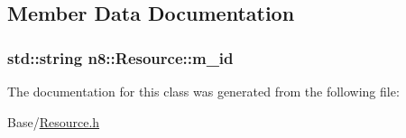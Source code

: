 \subsection{Member Data Documentation}
\hypertarget{classn8_1_1_resource_a7a80eb975bb76b4e8c5b3b60de210f23}{
\subsubsection[{m\-\_\-id}]{\setlength{\rightskip}{0pt plus 5cm}std\-::string n8\-::\-Resource\-::m\-\_\-id\hspace{0.3cm}{\ttfamily [private]}}}\label{classn8_1_1_resource_a7a80eb975bb76b4e8c5b3b60de210f23}


The documentation for this class was generated from the following file\-:\begin{DoxyCompactItemize}
\item 
Base/\hyperlink{_resource_8h}{Resource.\-h}\end{DoxyCompactItemize}
